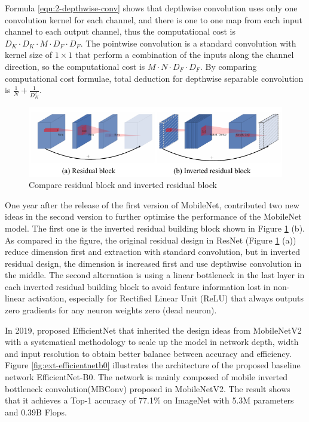 Formula \ref{equ:2-depthwise-conv} shows that depthwise convolution uses only one convolution kernel for each channel, and there is one to one map from each input channel to each output channel, thus the computational cost is $D_K \cdot D_K \cdot M \cdot D_F \cdot D_F$.
The pointwise convolution is a standard convolution with kernel size of $1\times1$ that perform a combination of the inputs along the channel direction, so the computational cost is $M \cdot N \cdot D_F \cdot D_F$.
By comparing computational cost formulae, total deduction for depthwise separable convolution is $\frac{1}{N}+\frac{1}{D_{K}^{2}}$.

\begin{figure}[!ht]
    \centering
    \includegraphics[width=.85\textwidth]{literature/imgs/ext-inverted-residual.pdf}
    \caption{Compare residual block and inverted residual block \cite{sandler2018mobilenetv2}}
    \label{fig:ext-inverted-residual}
\end{figure}

One year after the release of the first version of MobileNet, \citet{sandler2018mobilenetv2} contributed two new ideas in the second version to further optimise the performance of the MobileNet model.
The first one is the inverted residual building block shown in Figure \ref{fig:ext-inverted-residual} (b).
As compared in the figure, the original residual design in ResNet (Figure \ref{fig:ext-inverted-residual} (a)) reduce dimension first and extraction with standard convolution, but in inverted residual design, the dimension is increased first and use depthwise convolution in the middle.
The second alternation is using a linear bottleneck in the last layer in each inverted residual building block to avoid feature information lost in non-linear activation, especially for Rectified Linear Unit (ReLU) that always outputs zero gradients for any neuron weights zero (dead neuron).

In 2019, \citet{tan2020efficientnet} proposed EfficientNet that inherited the design ideas from MobileNetV2 with a systematical methodology to scale up the model in network depth, width and input resolution to obtain better balance between accuracy and efficiency.
Figure \ref{fig:ext-efficientnetb0} illustrates the architecture of the proposed baseline network EfficientNet-B0.
The network is mainly composed of mobile inverted bottleneck convolution(MBConv) proposed in MobileNetV2.
The result shows that it achieves a Top-1 accuracy of 77.1\% on ImageNet with 5.3M parameters and 0.39B Flops.


